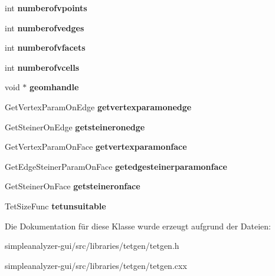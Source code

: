 \begin{DoxyCompactItemize}
\item 
\hypertarget{classtetgenio_a418782ab7caedfd9c316905996400553}{int {\bfseries numberofvpoints}}\label{classtetgenio_a418782ab7caedfd9c316905996400553}

\item 
\hypertarget{classtetgenio_a4c8ba7851351b7f70e3ef837e2900f74}{int {\bfseries numberofvedges}}\label{classtetgenio_a4c8ba7851351b7f70e3ef837e2900f74}

\item 
\hypertarget{classtetgenio_a054e5d022a3e6c6cb490975487390bba}{int {\bfseries numberofvfacets}}\label{classtetgenio_a054e5d022a3e6c6cb490975487390bba}

\item 
\hypertarget{classtetgenio_afbc917d5c352817d0668170f71bb8404}{int {\bfseries numberofvcells}}\label{classtetgenio_afbc917d5c352817d0668170f71bb8404}

\item 
\hypertarget{classtetgenio_a7d3bb20b8973217ce08614dabb3b7d2a}{void $\ast$ {\bfseries geomhandle}}\label{classtetgenio_a7d3bb20b8973217ce08614dabb3b7d2a}

\item 
\hypertarget{classtetgenio_a7278480edf09861f713ad92e589221f2}{Get\-Vertex\-Param\-On\-Edge {\bfseries getvertexparamonedge}}\label{classtetgenio_a7278480edf09861f713ad92e589221f2}

\item 
\hypertarget{classtetgenio_a08ab06b4e0af5a4911a0d5ae04fe08e3}{Get\-Steiner\-On\-Edge {\bfseries getsteineronedge}}\label{classtetgenio_a08ab06b4e0af5a4911a0d5ae04fe08e3}

\item 
\hypertarget{classtetgenio_abe5875cae7c00d505062e62e52e9a8dd}{Get\-Vertex\-Param\-On\-Face {\bfseries getvertexparamonface}}\label{classtetgenio_abe5875cae7c00d505062e62e52e9a8dd}

\item 
\hypertarget{classtetgenio_adc6e23ad6a58080844e7096a60d667cf}{Get\-Edge\-Steiner\-Param\-On\-Face {\bfseries getedgesteinerparamonface}}\label{classtetgenio_adc6e23ad6a58080844e7096a60d667cf}

\item 
\hypertarget{classtetgenio_a611b575fcfc845416f2d151afcf5c6aa}{Get\-Steiner\-On\-Face {\bfseries getsteineronface}}\label{classtetgenio_a611b575fcfc845416f2d151afcf5c6aa}

\item 
\hypertarget{classtetgenio_ad57af35c7c480da03af06b1388a4a8f7}{Tet\-Size\-Func {\bfseries tetunsuitable}}\label{classtetgenio_ad57af35c7c480da03af06b1388a4a8f7}

\end{DoxyCompactItemize}


Die Dokumentation für diese Klasse wurde erzeugt aufgrund der Dateien\-:\begin{DoxyCompactItemize}
\item 
simpleanalyzer-\/gui/src/libraries/tetgen/tetgen.\-h\item 
simpleanalyzer-\/gui/src/libraries/tetgen/tetgen.\-cxx\end{DoxyCompactItemize}
